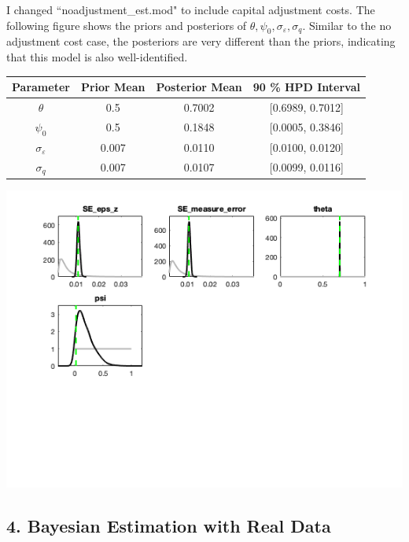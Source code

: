 \documentclass{article}
\begin{document}
I changed ``noadjustment\_est.mod" to include capital adjustment costs.  The following figure shows the priors and posteriors of $\theta, \psi_0, \sigma_\varepsilon, \sigma_q$.  Similar to the no adjustment cost case, the posteriors are very different than the priors, indicating that this model is also well-identified.

\begin{table}[h!]
  \begin{center}
    \label{tab:table1}
    \begin{tabular}{c|ccc}
      Parameter            & Prior Mean & Posterior Mean & 90 \% HPD Interval\\
      \hline
      $\theta$             & 0.5      & 0.7002         & [0.6989, 0.7012]\\
      $\psi_0$             & 0.5      & 0.1848         & [0.0005, 0.3846]\\
      $\sigma_\varepsilon$ & 0.007    & 0.0110         & [0.0100, 0.0120] \\
      $\sigma_q$           & 0.007    & 0.0107         & [0.0099, 0.0116] 
    \end{tabular}
  \end{center}
\end{table}

\includegraphics[scale=.8]{p4_priors_posteriors}

\subsection*{4. Bayesian Estimation with Real Data}
\end{document}
